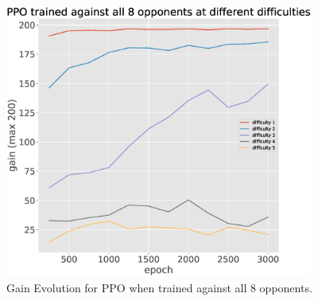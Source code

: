 \documentclass[boxes]{beamer}
\begin{document}
\begin{frame}{\phantom{Results: all difficulties, generalised}}
  \vspace{-1.1cm}
  \begin{figure}[htbp]
    \centering
    \includegraphics[width=0.9\textwidth]{images/general_harmonic_gain.eps}
    \caption{Gain Evolution for PPO when trained against all 8 opponents.}
    \label{fig:ppo_train_8}
    \end{figure}
\end{frame}
\end{document}
